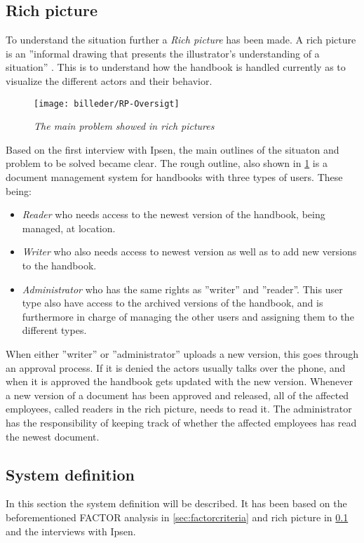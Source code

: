 \subsection{Rich picture} \label{sec:richpictures}

To understand the situation further a \textit{Rich picture} has been made. A rich picture is an ''informal drawing that presents the illustrator's understanding of a situation'' \citep[~p. 26]{Rod-Aalborg}.
This is to understand how the handbook is handled currently as to visualize the different actors and their behavior.

\begin{figure}[H]
	\centering
	\texttt{[image: billeder/RP-Oversigt]}
	\caption{\textit{The main problem showed in rich pictures
	}}
	\label{fig:RP-Oversigt}
\end{figure}

Based on the first interview with Ipsen, the main outlines of the situaton and problem to be solved became clear.
The rough outline, also shown in \cref{fig:RP-Oversigt} is a document management system for handbooks with three types of users. These being: 
\begin{itemize}
	\item 
	 \textit{Reader} who needs access to the newest version of the handbook, being managed, at location.
	\item 
	 \textit{Writer} who also needs access to newest version as well as to add new versions to the handbook.
	\item 
	 \textit{Administrator} who has the same rights as ''writer'' and ''reader''.
	 This user type also have access to the archived versions of the handbook, and is furthermore in charge of managing the other users and assigning them to the different types.
\end{itemize}
When either ''writer'' or ''administrator'' uploads a new version, this goes through an approval process.
If it is denied the actors usually talks over the phone, and when it is approved the handbook gets updated with the new version.
Whenever a new version of a document has been approved and released, all of the affected employees, called readers in the rich picture, needs to read it.
The administrator has the responsibility of keeping track of whether the affected employees has read the newest document.

\subsection{System definition}
In this section the system definition will be described. 
It has been based on the beforementioned FACTOR analysis in \cref{sec:factorcriteria} and rich picture in \cref{sec:richpictures} and the interviews with Ipsen.

